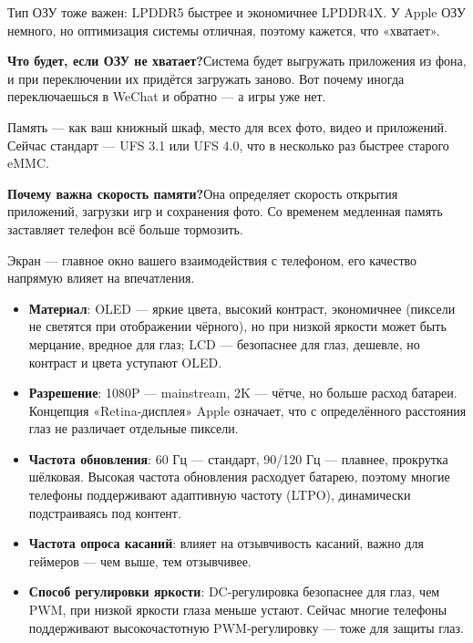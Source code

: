 Тип ОЗУ тоже важен: LPDDR5 быстрее и экономичнее LPDDR4X. У Apple ОЗУ немного, но оптимизация системы отличная, поэтому кажется, что «хватает».

\textbf{Что будет, если ОЗУ не хватает?}Система будет выгружать приложения из фона, и при переключении их придётся загружать заново. Вот почему иногда переключаешься в WeChat и обратно — а игры уже нет.


Память — как ваш книжный шкаф, место для всех фото, видео и приложений. Сейчас стандарт — UFS 3.1 или UFS 4.0, что в несколько раз быстрее старого eMMC.

\textbf{Почему важна скорость памяти?}Она определяет скорость открытия приложений, загрузки игр и сохранения фото. Со временем медленная память заставляет телефон всё больше тормозить.


Экран — главное окно вашего взаимодействия с телефоном, его качество напрямую влияет на впечатления.

\begin{itemize}
  \item \textbf{Материал}: OLED — яркие цвета, высокий контраст, экономичнее (пиксели не светятся при отображении чёрного), но при низкой яркости может быть мерцание, вредное для глаз; LCD — безопаснее для глаз, дешевле, но контраст и цвета уступают OLED.
  \item \textbf{Разрешение}: 1080P — mainstream, 2K — чётче, но больше расход батареи. Концепция «Retina-дисплея» Apple означает, что с определённого расстояния глаз не различает отдельные пиксели.
  \item \textbf{Частота обновления}: 60 Гц — стандарт, 90/120 Гц — плавнее, прокрутка шёлковая. Высокая частота обновления расходует батарею, поэтому многие телефоны поддерживают адаптивную частоту (LTPO), динамически подстраиваясь под контент.
  \item \textbf{Частота опроса касаний}: влияет на отзывчивость касаний, важно для геймеров — чем выше, тем отзывчивее.
  \item \textbf{Способ регулировки яркости}: DC-регулировка безопаснее для глаз, чем PWM, при низкой яркости глаза меньше устают. Сейчас многие телефоны поддерживают высокочастотную PWM-регулировку — тоже для защиты глаз.
\end{itemize}


